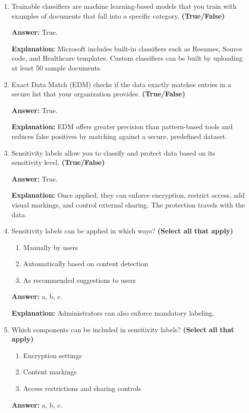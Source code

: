 \documentclass[10pt]{article}
\begin{document}
\begin{enumerate}[leftmargin=*]
\textbf{Explanation:} These information types are recognized using regex patterns, checksums, keyword evidence, and confidence scoring.

\item Trainable classifiers are machine learning-based models that you train with examples of documents that fall into a specific category. \textbf{(True/False)}

\textbf{Answer:} True.

\textbf{Explanation:} Microsoft includes built-in classifiers such as Resumes, Source code, and Healthcare templates. Custom classifiers can be built by uploading at least 50 sample documents.

\item Exact Data Match (EDM) checks if the data exactly matches entries in a secure list that your organization provides. \textbf{(True/False)}

\textbf{Answer:} True.

\textbf{Explanation:} EDM offers greater precision than pattern-based tools and reduces false positives by matching against a secure, predefined dataset.

\item Sensitivity labels allow you to classify and protect data based on its sensitivity level. \textbf{(True/False)}

\textbf{Answer:} True.

\textbf{Explanation:} Once applied, they can enforce encryption, restrict access, add visual markings, and control external sharing. The protection travels with the data.

\item Sensitivity labels can be applied in which ways? \textbf{(Select all that apply)}
\begin{enumerate}[label=\alph*., leftmargin=1.5em]
\item Manually by users
\item Automatically based on content detection
\item As recommended suggestions to users
\end{enumerate}
\textbf{Answer:} a, b, c.

\textbf{Explanation:} Administrators can also enforce mandatory labeling.

\item Which components can be included in sensitivity labels? \textbf{(Select all that apply)}
\begin{enumerate}[label=\alph*., leftmargin=1.5em]
\item Encryption settings
\item Content markings
\item Access restrictions and sharing controls
\end{enumerate}
\textbf{Answer:} a, b, c.


\end{enumerate}
\end{document}
